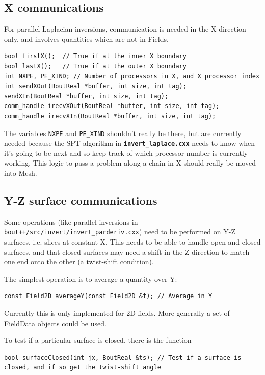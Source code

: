 \documentclass[12pt]{article}
\newcommand{\code}[1]{\texttt{#1}}
\newcommand{\file}[1]{\texttt{\bf #1}}
\begin{document}
\subsection{X communications}

For parallel Laplacian inversions, communication is needed in the X
direction only, and involves quantities which are not in Fields.

\begin{lstlisting}
bool firstX();  // True if at the inner X boundary
bool lastX();   // True if at the outer X boundary
int NXPE, PE_XIND; // Number of processors in X, and X processor index
int sendXOut(BoutReal *buffer, int size, int tag);
sendXIn(BoutReal *buffer, int size, int tag);
comm_handle irecvXOut(BoutReal *buffer, int size, int tag);
comm_handle irecvXIn(BoutReal *buffer, int size, int tag);
\end{lstlisting}

The variables \code{NXPE} and \code{PE\_XIND} shouldn't really be there,
but are currently needed because the SPT algorithm in \file{invert\_laplace.cxx}
needs to know when it's going to be next and so keep track of which processor
number is currently working. This logic to pass a problem along a chain in
X should really be moved into Mesh.

\subsection{Y-Z surface communications}

Some operations (like parallel inversions in \texttt{bout++/src/invert/invert\_parderiv.cxx}) need to be performed on
Y-Z surfaces, i.e. slices at constant X. This needs to be able to
handle open and closed surfaces, and that closed surfaces may need a 
shift in the Z direction to match one end onto the other (a twist-shift
condition).

The simplest operation is to average a quantity over Y:
\begin{lstlisting}
const Field2D averageY(const Field2D &f); // Average in Y
\end{lstlisting}
Currently this is only implemented for 2D fields. More generally a 
set of FieldData objects could be used.

To test if a particular surface is closed, there is the function
\begin{lstlisting}
bool surfaceClosed(int jx, BoutReal &ts); // Test if a surface is closed, and if so get the twist-shift angle
\end{lstlisting}
\end{document}
